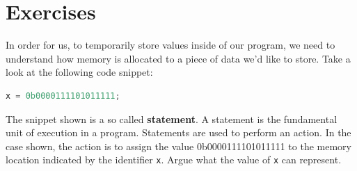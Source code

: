 \documentclass{dcbl/challenge}
\begin{document}
\section*{Exercises}
\begin{aufgabe}
    In order for us, to temporarily store values inside of our program, we need to understand how memory is allocated to a piece of data we'd like to store.
    Take a look at the following code snippet:
    \begin{lstlisting}[language=c]
        x = 0b0000111101011111;
    \end{lstlisting}
    The snippet shown is a so called \textbf{statement}.
    A statement is the fundamental unit of execution in a program.
    Statements are used to perform an action. 
    In the case shown, the action is to assign the value 0b0000111101011111 to the memory location indicated by the identifier \texttt{x}.
    Argue what the value of \texttt{x} can represent.
\end{aufgabe}
\end{document}
